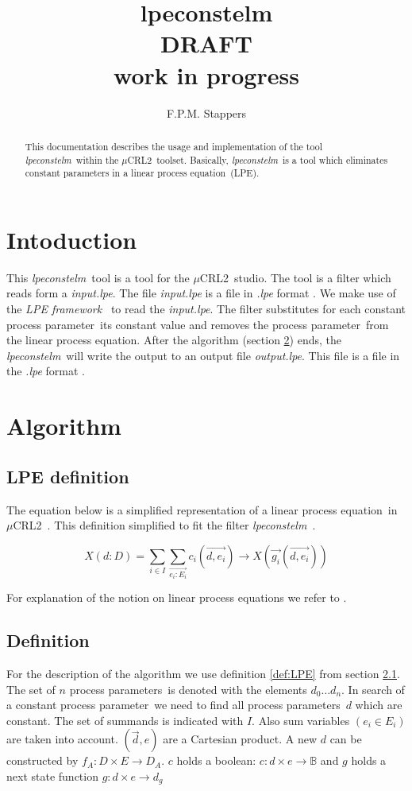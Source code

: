 \documentclass[a4paper,10pt]{article}
\title{lpeconstelm \\ DRAFT \\ work in progress}
\author{F.P.M. Stappers}
\newcommand{\lpe}{linear process equation}
\newcommand{\tool}{\textit{lpeconstelm}}
\newcommand{\ovr}{\overrightarrow}
\newcommand{\mcrl}{$\mu$CRL2}
\newcommand{\framework}{\textit{LPE framework} \cite{LPEframework}}
\newcommand{\pp}{process parameter}
\newcommand{\pps}{process parameters}
\newcommand{\ti}{\textit}
\begin{document}
\maketitle

\begin{abstract}
This documentation describes the usage and implementation of  the tool \tool\ within the \mcrl\ toolset.
Basically, \tool\ is a tool which eliminates constant parameters in a \lpe\ (LPE).
\end{abstract}

\tableofcontents

\section{Intoduction}
This \tool\ tool is a tool for the \mcrl\ studio. The tool is a
filter which reads form a \ti{input.lpe}. The file \ti{input.lpe} is
a file in \ti{.lpe} format \cite{LPEformat}. We make use of the
\framework\ to read the \ti{input.lpe}. The filter substitutes for
each constant \pp\ its constant value and removes the \pp\ from the
\lpe . After the algorithm (section \ref{sec:alg}) ends, the \tool\
will write the output to an output file \ti{output.lpe}. This file is
a file in the \ti{.lpe} format \cite{LPEformat}.

\section{Algorithm} \label{sec:alg}

\subsection{LPE definition}\label{sdef}
The equation below is a simplified representation of a \lpe\ in \mcrl\ . This definition simplified to fit 
the filter \tool\ . 
\begin{defn}\label{def:LPE}
\begin{displaymath}
X (d:D) = \sum_{i \in I} \sum_{\ovr{e_i:E_i}} c_i ( \ovr{d, e_i} ) \rightarrow X(\ovr{g_i}(\ovr{d,e_i}))
\end{displaymath}
\end{defn}
For explanation of the notion on \lpe s  we refer to \cite{LPE_info}.

\subsection{Definition}
For the description of the algorithm we use definition \ref{def:LPE}
from section \ref{sdef}. The set of $n$ \pps\ is denoted with the
elements $d_0 \ldots d_n$. In search of a constant \pp\ we need to
find all \pps\ $d$ which are constant. The set of summands is
indicated with $I$. Also sum variables $(e_i \in E_i)$
are taken into account. %
$(\ovr{d},e)$ are a Cartesian product. A new $d$ can be constructed by $f_A: D \times E \rightarrow D_A$.
$c$ holds a boolean: $c: d \times e \rightarrow \mathbb{B}$ and $g$ holds a next state function $g: d \times e \rightarrow d_g$
\end{document}
